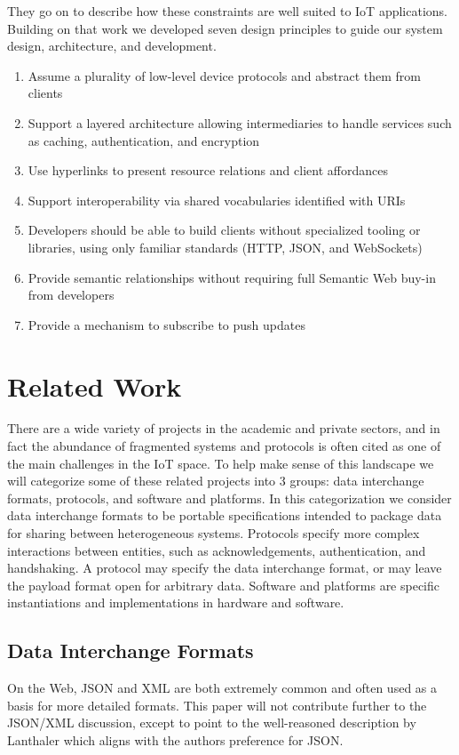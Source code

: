 \documentclass{acm_proc_article-sp}
\newenvironment{tightenumerate}{
    \vspace{-10pt}
    \begin{enumerate}
        \setlength{\parskip}{-1pt}}{
    \end{enumerate}
    \vspace{-10pt}}
\begin{document}
They go on to describe how these constraints are well suited to IoT
applications. Building on that work we developed seven design principles to guide
our system design, architecture, and development.

\begin{tightenumerate}
    \item Assume a plurality of low-level device protocols and abstract them
        from clients
    \item Support a layered architecture allowing intermediaries to handle
        services such as caching, authentication, and encryption
    \item Use hyperlinks to present resource relations and client affordances
    \item Support interoperability via shared vocabularies identified with URIs
    \item Developers should be able to build clients without specialized
        tooling or libraries, using only familiar standards (HTTP, JSON, and
        WebSockets)
    \item Provide semantic relationships without requiring full Semantic Web
        buy-in from developers
    \item Provide a mechanism to subscribe to push updates
\end{tightenumerate}

\section{Related Work}

There are a wide variety of projects in the academic and private sectors, and
in fact the abundance of fragmented systems and protocols is often cited as one
of the main challenges in the IoT space. To help make sense of this landscape
we will categorize some of these related projects into 3 groups: data
interchange formats, protocols, and software and platforms. In this
categorization we consider data interchange formats to be portable
specifications intended to package data for sharing between heterogeneous
systems. Protocols specify more complex interactions between entities, such as
acknowledgements, authentication, and handshaking. A protocol may specify the
data interchange format, or may leave the payload format open for arbitrary
data. Software and platforms are specific instantiations and implementations in
hardware and software.

\subsection{Data Interchange Formats} On the Web, JSON and XML are both
extremely common and often used as a basis for more detailed formats. This
paper will not contribute further to the JSON/XML discussion, except to point
to the well-reasoned description by Lanthaler\cite{semaphobia} which aligns
with the authors preference for JSON.
\end{document}
